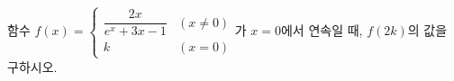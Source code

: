 함수 $f(x)=\begin{cases} \dfrac{2x}{e^x+3x-1} & (x\ne 0) \\ k & (x=0) \end{cases}$가 $x=0$에서 연속일 때, $f(2k)$의 값을 구하시오. 

